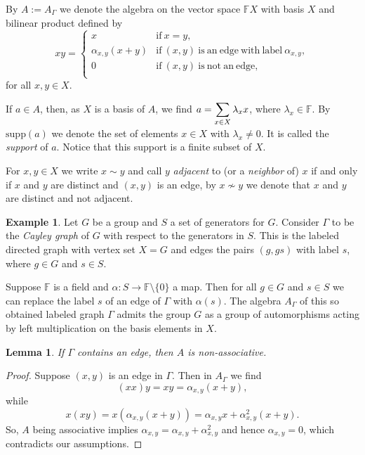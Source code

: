 \documentclass[oneside,a4paper]{amsart} %
\newtheorem{lemma}[proposition]{Lemma}
\theoremstyle{definition}
\newtheorem{example}[proposition]{Example}
\begin{document}
By $A:=A_{\Gamma}$ we denote the algebra on the vector space $\mathbb{F}X$ with basis $X$ and bilinear product defined by 
$$xy=\begin{cases}
x&\mathrm{if}\ x=y,\\
\alpha_{x,y} (x+y)&\mathrm{if}\ (x,y) \ \mathrm{is\ an\ edge\ with\ label \ }\alpha_{x,y},\\
0 &\mathrm{if}\ (x,y)\ \mathrm{is\ not\ an\ edge},\\
\end{cases}$$
for all $x,y\in X$.

If $a\in A$, then, as $X$ is a basis of $A$, we find  $a=\displaystyle\displaystyle\sum_{x\in X}\lambda_x x$, where  $\lambda_x\in \mathbb{F}$.
By $\mathrm{supp}(a)$ we denote the set of elements $x\in X$ with $\lambda_x\neq 0$. It is called the \emph{support} of $a$.
Notice that this support is a finite subset of $X$.

For $x,y\in X$ we write $x\sim y$ and call $y$ \emph{adjacent} to (or a \emph{neighbor} of)  $x$ if and only if $x$ and $y$ are distinct and  $(x,y)$  is an edge, by $x\not\sim y$ we denote that $x$ and $y$ are distinct and not adjacent.



\begin{example}\label{cayley}
Let $G$ be a group and $S$ a set of generators for $G$.
Consider $\Gamma$ to be the \emph{Cayley graph} of $G$ with respect to the generators in $S$.
This is the labeled directed graph with vertex set $X=G$ and  edges the pairs $(g,gs)$ with label $s$, where $g\in G$ and $s\in S$.

Suppose $\mathbb{F}$ is a field and  $\alpha:S\rightarrow\mathbb{F}\setminus \{0\}$  a map.
Then for all $g\in G$ and $s\in S$ we can replace the label $s$ of an edge of $\Gamma$ with $\alpha(s)$.
The algebra $A_\Gamma$ of this so obtained labeled graph $\Gamma$ admits the group $G$ as a group of automorphisms acting by left multiplication on the basis elements in $X$. 
\end{example}


\begin{lemma}
If $\Gamma$ contains an edge, then $A$ is non-associative.
\end{lemma}

\begin{proof}
Suppose $(x,y)$ is an edge in $\Gamma$.
Then in $A_\Gamma$ we find $$(xx)y=xy=\alpha_{x,y} (x+y),$$
while $$x(xy)=x(\alpha_{x,y}(x+y))=\alpha_{x,y} x+ \alpha_{x,y}^2(x+y).$$
So, $A$ being associative implies 
$\alpha_{x,y}=\alpha_{x,y}+\alpha_{x,y}^2$ and hence
$\alpha_{x,y}=0$, which contradicts our assumptions.
\end{proof}
\end{document}
